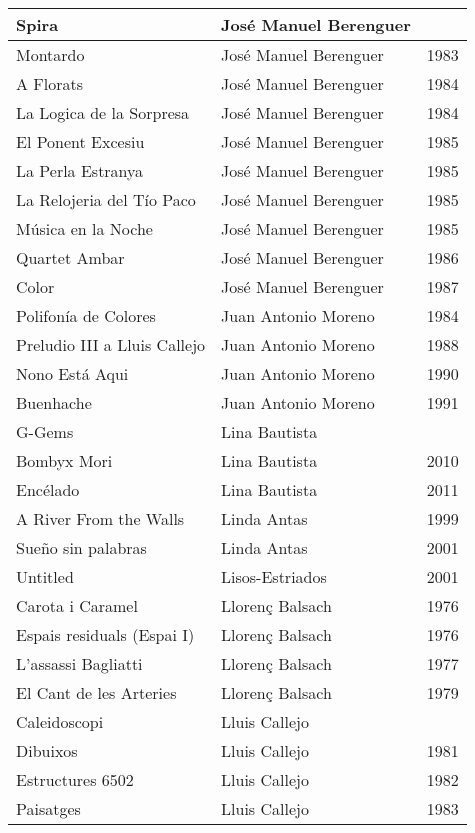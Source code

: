 \begin{center}
\begin{longtable}{ p{}  p{}  p{} }
Spira & José Manuel Berenguer &  \\ \midrule 
Montardo & José Manuel Berenguer & 1983 \\ \midrule 
A Florats & José Manuel Berenguer & 1984 \\ \midrule 
La Logica de la Sorpresa & José Manuel Berenguer & 1984 \\ \midrule 
El Ponent Excesiu & José Manuel Berenguer & 1985 \\ \midrule 
La Perla Estranya & José Manuel Berenguer & 1985 \\ \midrule 
La Relojeria del Tío Paco & José Manuel Berenguer & 1985 \\ \midrule 
Música en la Noche & José Manuel Berenguer & 1985 \\ \midrule 
Quartet Ambar & José Manuel Berenguer & 1986 \\ \midrule 
Color & José Manuel Berenguer & 1987 \\ \midrule 
Polifonía de Colores & Juan Antonio Moreno & 1984 \\ \midrule 
Preludio III a Lluis Callejo & Juan Antonio Moreno & 1988 \\ \midrule 
Nono Está Aqui & Juan Antonio Moreno & 1990 \\ \midrule 
Buenhache & Juan Antonio Moreno & 1991 \\ \midrule 
G-Gems & Lina Bautista &  \\ \midrule 
Bombyx Mori & Lina Bautista & 2010 \\ \midrule 
Encélado & Lina Bautista & 2011 \\ \midrule 
A River From the Walls & Linda Antas & 1999 \\ \midrule 
Sueño sin palabras & Linda Antas & 2001 \\ \midrule 
Untitled & Lisos-Estriados & 2001 \\ \midrule 
Carota i Caramel & Llorenç Balsach & 1976 \\ \midrule 
Espais residuals (Espai I) & Llorenç Balsach & 1976 \\ \midrule 
L'assassi Bagliatti & Llorenç Balsach & 1977 \\ \midrule 
El Cant de les Arteries & Llorenç Balsach & 1979 \\ \midrule 
Caleidoscopi & Lluis Callejo &  \\ \midrule 
Dibuixos & Lluis Callejo & 1981 \\ \midrule 
Estructures 6502 & Lluis Callejo & 1982 \\ \midrule 
Paisatges & Lluis Callejo & 1983 \\ \midrule 

\end{longtable}
\end{center}
